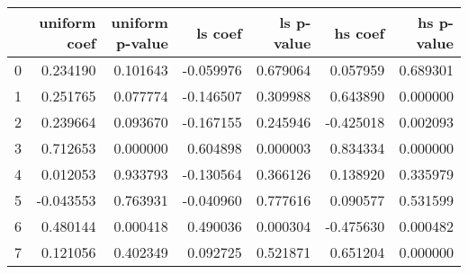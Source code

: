 \begin{tabular}{lrrrrrr}
\toprule
 & uniform coef & uniform p-value & ls coef & ls p-value & hs coef & hs p-value \\
\midrule
0 & 0.234190 & 0.101643 & -0.059976 & 0.679064 & 0.057959 & 0.689301 \\
1 & 0.251765 & 0.077774 & -0.146507 & 0.309988 & 0.643890 & 0.000000 \\
2 & 0.239664 & 0.093670 & -0.167155 & 0.245946 & -0.425018 & 0.002093 \\
3 & 0.712653 & 0.000000 & 0.604898 & 0.000003 & 0.834334 & 0.000000 \\
4 & 0.012053 & 0.933793 & -0.130564 & 0.366126 & 0.138920 & 0.335979 \\
5 & -0.043553 & 0.763931 & -0.040960 & 0.777616 & 0.090577 & 0.531599 \\
6 & 0.480144 & 0.000418 & 0.490036 & 0.000304 & -0.475630 & 0.000482 \\
7 & 0.121056 & 0.402349 & 0.092725 & 0.521871 & 0.651204 & 0.000000 \\
\bottomrule
\end{tabular}
